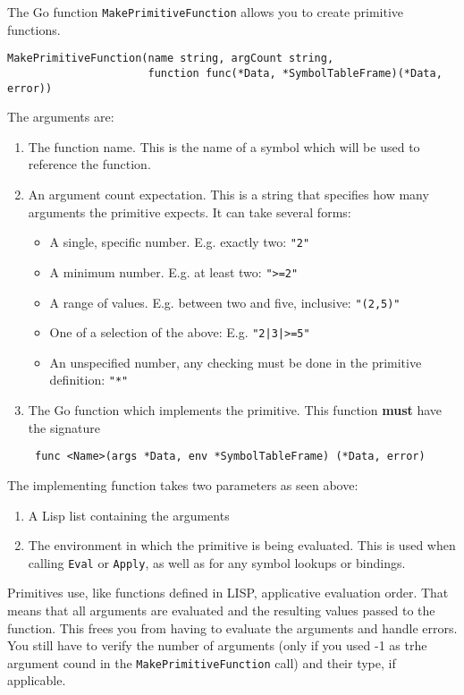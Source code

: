 \documentclass{article}
\begin{document}
The Go function \verb|MakePrimitiveFunction| allows you to create primitive functions.

\begin{verbatim}
MakePrimitiveFunction(name string, argCount string,
                      function func(*Data, *SymbolTableFrame)(*Data, error))
\end{verbatim}

The arguments are:

\begin{enumerate}
\item The function name. This is the name of a symbol which will be used to reference the
  function.
\item An argument count expectation. This is a string that specifies how many arguments the
  primitive expects. It can take several forms:
  \begin{itemize}
  \item A single, specific number. E.g. exactly two: \verb|"2"|
  \item A minimum number. E.g. at least two: \verb|">=2"|
  \item A range of values. E.g. between two and five, inclusive: \verb|"(2,5)"|
  \item One of a selection of the above: E.g.
    \verb?"2|3|>=5"?
  \item An unspecified number, any checking must be done in the primitive definition:
    \verb|"*"|
  \end{itemize}
\item The Go function which implements the primitive. This function \textbf{must} have the
  signature
\begin{verbatim}
 func <Name>(args *Data, env *SymbolTableFrame) (*Data, error)
\end{verbatim}
\end{enumerate}

The implementing function takes two parameters as seen above:

\begin{enumerate}
\item A Lisp list containing the arguments
\item The environment in which the primitive is being evaluated. This is used when calling
  \verb|Eval| or \verb|Apply|, as well as for any symbol lookups or bindings.
\end{enumerate}

Primitives use, like functions defined in LISP, applicative evaluation order. That means that
all arguments are evaluated and the resulting values passed to the function. This frees you
from having to evaluate the arguments and handle errors. You still have to verify the number
of arguments (only if you used -1 as trhe argument cound in the \verb|MakePrimitiveFunction|
call) and their type, if applicable.
\end{document}
